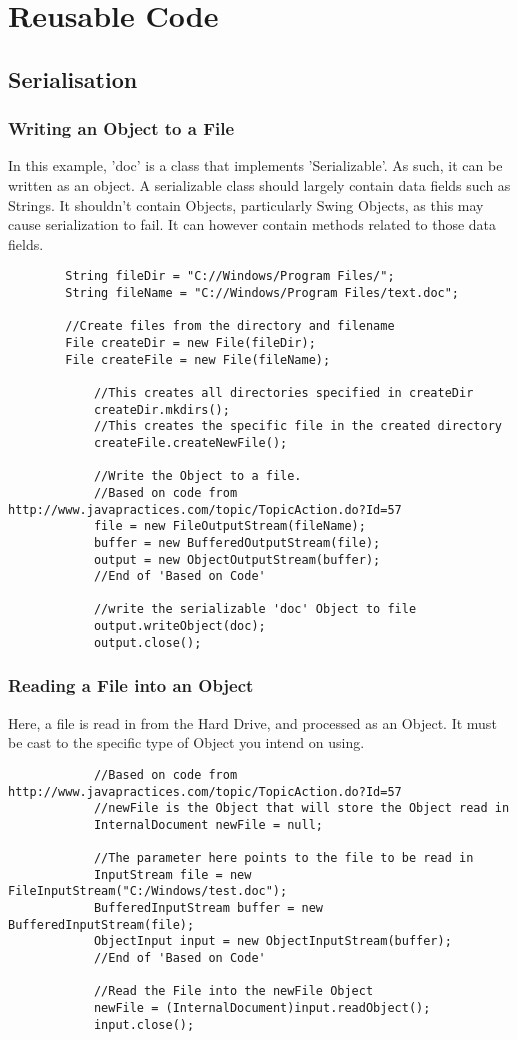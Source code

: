 \documentclass[a4paper, 12pt]{article}
\begin{document}
\newpage
\section{Reusable Code}
\subsection{Serialisation}
\subsubsection{Writing an Object to a File}
In this example, 'doc' is a class that implements 'Serializable'. As such, it can be written as an object. A serializable class should largely contain data fields such as Strings. It shouldn't contain Objects, particularly Swing Objects, as this may cause serialization to fail. It can however contain methods related to those data fields.
\begin{lstlisting}
		String fileDir = "C://Windows/Program Files/";
		String fileName = "C://Windows/Program Files/text.doc";
		
		//Create files from the directory and filename
		File createDir = new File(fileDir);
		File createFile = new File(fileName);
		
			//This creates all directories specified in createDir
			createDir.mkdirs();
			//This creates the specific file in the created directory
			createFile.createNewFile();
			
			//Write the Object to a file.
			//Based on code from http://www.javapractices.com/topic/TopicAction.do?Id=57
			file = new FileOutputStream(fileName);
			buffer = new BufferedOutputStream(file);
			output = new ObjectOutputStream(buffer);
			//End of 'Based on Code'

			//write the serializable 'doc' Object to file
			output.writeObject(doc);
			output.close();
\end{lstlisting}

\newpage
\subsubsection{Reading a File into an Object}
Here, a file is read in from the Hard Drive, and processed as an Object. It must be cast to the specific type of Object you intend on using.
\begin{lstlisting}
			//Based on code from http://www.javapractices.com/topic/TopicAction.do?Id=57
			//newFile is the Object that will store the Object read in
			InternalDocument newFile = null;
					
			//The parameter here points to the file to be read in
			InputStream file = new FileInputStream("C:/Windows/test.doc");
			BufferedInputStream buffer = new BufferedInputStream(file);
			ObjectInput input = new ObjectInputStream(buffer);
			//End of 'Based on Code'

			//Read the File into the newFile Object
			newFile = (InternalDocument)input.readObject();
			input.close();
\end{lstlisting}
\end{document}
